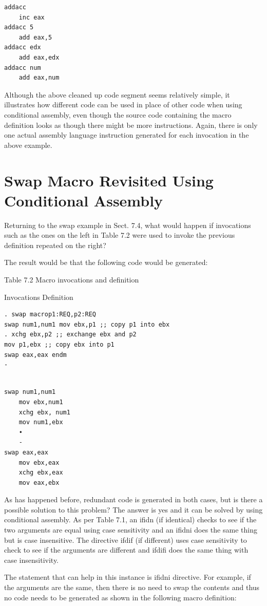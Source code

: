 \documentclass[10pt]{book}
\begin{document}
\begin{verbatim}
addacc
    inc eax
addacc 5
    add eax,5
addacc edx
    add eax,edx
addacc num
    add eax,num
\end{verbatim}

Although the above cleaned up code segment seems relatively simple, it illustrates how different code can be used in place of other code when using conditional assembly, even though the source code containing the macro definition looks as though there might be more instructions. Again, there is only one actual assembly language instruction generated for each invocation in the above example.

\section{Swap Macro Revisited Using Conditional Assembly}
Returning to the swap example in Sect. 7.4, what would happen if invocations such as the ones on the left in Table 7.2 were used to invoke the previous definition repeated on the right?

The result would be that the following code would be generated:

Table 7.2 Macro invocations and definition


Invocations Definition
\begin{verbatim}
. swap macrop1:REQ,p2:REQ
swap num1,num1 mov ebx,p1 ;; copy p1 into ebx
. xchg ebx,p2 ;; exchange ebx and p2
mov p1,ebx ;; copy ebx into p1
swap eax,eax endm
-
\end{verbatim}

\begin{verbatim}
      
swap num1,num1
    mov ebx,num1
    xchg ebx, num1
    mov num1,ebx
    •
    -
swap eax,eax
    mov ebx,eax
    xchg ebx,eax
    mov eax,ebx
\end{verbatim}

As has happened before, redundant code is generated in both cases, but is there a possible solution to this problem? The answer is yes and it can be solved by using conditional assembly. As per Table 7.1, an ifidn (if identical) checks to see if the two arguments are equal using case sensitivity and an ifidni does the same thing but is case insensitive. The directive ifdif (if different) uses case sensitivity to check to see if the arguments are different and ifdifi does the same thing with case insensitivity.

The statement that can help in this instance is ifidni directive. For example, if the arguments are the same, then there is no need to swap the contents and thus no code needs to be generated as shown in the following macro definition:
\end{document}
